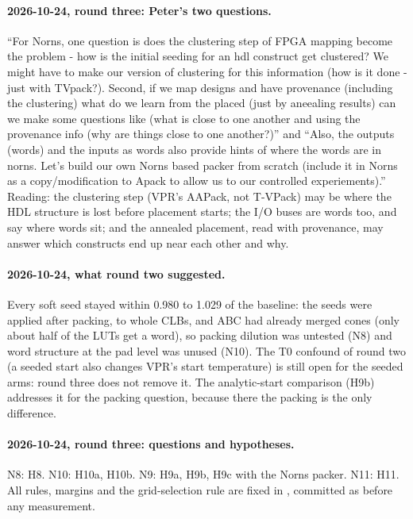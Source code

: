 \paragraph{2026-10-24, round three: Peter's two questions.} ``For Norns, one question is does the clustering step of FPGA mapping become the problem - how is the initial seeding for an hdl construct get clustered? We might have to make our version of clustering for this information (how is it done - just with TVpack?). Second, if we map designs and have provenance (including the clustering) what do we learn from the placed (just by aneealing results) can we make some questions like (what is close to one another and using the provenance info (why are things close to one another?)''
and ``Also, the outputs (words) and the inputs as words also provide hints of where the words are in norns. Let's build our own Norns based packer from scratch (include it in Norns as a copy/modification to Apack to allow us to our controlled experiements).''
Reading: the clustering step (VPR's AAPack, not T-VPack) may be where the HDL structure is lost before placement
starts; the I/O buses are words too, and say where words sit; and the annealed placement, read with provenance, may
answer which constructs end up near each other and why.

\paragraph{2026-10-24, what round two suggested.} Every soft seed stayed within 0.980 to 1.029 of the baseline:
the seeds were applied after packing, to whole CLBs, and ABC had already merged cones (only about half of the LUTs get a
word), so packing dilution was untested (N8) and word structure at the pad level was unused (N10). The T0 confound of
round two (a seeded start also changes VPR's start temperature) is still open for the seeded arms: round three does not
remove it. The analytic-start comparison (H9b) addresses it for the packing question, because there the packing is the only difference.

\paragraph{2026-10-24, round three: questions and hypotheses.} N8: H8. N10: H10a, H10b. N9: H9a, H9b, H9c with the
Norns packer. N11: H11. All rules, margins and the grid-selection rule are fixed in , committed as
 before any measurement.

